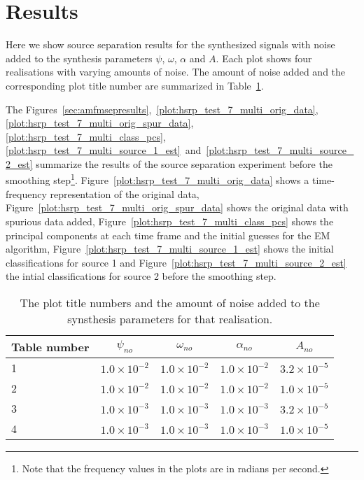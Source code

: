 \section{Results \label{sec:amfmsepresults}}

Here we show source separation results for the synthesized signals with 
noise added to the synthesis parameters $\psi$, $\omega$, $\alpha$
and $A$. Each plot shows four realisations with varying amounts of noise. The
amount of noise added and the corresponding plot title number are
summarized in Table~\ref{tab:amfmexpplotkey}.

The Figures~\ref{sec:amfmsepresults},~\ref{plot:hsrp_test_7_multi_orig_data},
\ref{plot:hsrp_test_7_multi_orig_spur_data},~%
\ref{plot:hsrp_test_7_multi_class_pcs},~%
\ref{plot:hsrp_test_7_multi_source_1_est}~and~\ref{plot:hsrp_test_7_multi_source_2_est}
summarize the results of the
source separation experiment before the smoothing step\footnote{Note that the
    frequency values in the plots are in radians per second.}.
Figure~\ref{plot:hsrp_test_7_multi_orig_data} shows a time-frequency
representation of the original data,
Figure~\ref{plot:hsrp_test_7_multi_orig_spur_data} shows the original data with
spurious data added, Figure~\ref{plot:hsrp_test_7_multi_class_pcs} shows the
principal components at each time frame and the initial guesses for the EM
algorithm, Figure~\ref{plot:hsrp_test_7_multi_source_1_est} shows the initial
classifications for source 1 and
Figure~\ref{plot:hsrp_test_7_multi_source_2_est} the intial classifications for
source 2 before the smoothing step.


\begin{table}
    \begin{center}
        \begin{tabular}{l c c c c}
            Table number & $\psi_{no}$ & $\omega_{no}$ & $\alpha_{no}$ &
            $A_{no}$ \\
            \hline
            1 & $1.0 \times 10^{-2}$ & $1.0 \times 10^{-2}$ & $1.0 \times 10^{-2}$ &
            $3.2 \times 10^{-5}$ \\
            2 & $1.0 \times 10^{-2}$ & $1.0 \times 10^{-2}$ & $1.0 \times 10^{-2}$ &
            $1.0 \times 10^{-5}$ \\
            3 & $1.0 \times 10^{-3}$ & $1.0 \times 10^{-3}$ & $1.0 \times 10^{-3}$ &
            $3.2 \times 10^{-5}$ \\
            4 & $1.0 \times 10^{-3}$ & $1.0 \times 10^{-3}$ & $1.0 \times 10^{-3}$ &
            $1.0 \times 10^{-5}$ \\
        \end{tabular}
    \end{center}
    \caption{The plot title numbers and the amount of noise added to the
    synsthesis parameters for that realisation. \label{tab:amfmexpplotkey}}
\end{table}

